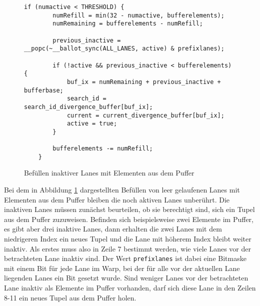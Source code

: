 \begin{figure}[]
	\begin{lstlisting}[language=MyC++]
	if (numactive < THRESHOLD) {
		numRefill = min(32 - numactive, bufferelements);
		numRemaining = bufferelements - numRefill;
		
		previous_inactive = __popc(~__ballot_sync(ALL_LANES, active) & prefixlanes);
		
		if (!active && previous_inactive < bufferelements) {
			buf_ix = numRemaining + previous_inactive + bufferbase;
			search_id = search_id_divergence_buffer[buf_ix];
			current = current_divergence_buffer[buf_ix];
			active = true;
		}
		
		bufferelements -= numRefill;
	}
	\end{lstlisting}
	\caption{Befüllen inaktiver Lanes mit Elementen aus dem Puffer}
	\label{refill_code}
\end{figure}

Bei dem in Abbildung \ref{refill_code} dargestellten Befüllen von leer gelaufenen Lanes mit Elementen aus dem Puffer bleiben die noch aktiven Lanes unberührt.
Die inaktiven Lanes müssen zunächst beurteilen, ob sie berechtigt sind, sich ein Tupel aus dem Puffer zuzuweisen.
Befinden sich beispielsweise zwei Elemente im Puffer, es gibt aber drei inaktive Lanes, dann erhalten die zwei Lanes mit dem niedrigeren Index ein neues Tupel und die Lane mit höherem Index bleibt weiter inaktiv.
Als erstes muss also in Zeile 7 bestimmt werden, wie viele Lanes vor der betrachteten Lane inaktiv sind.
Der Wert \texttt{prefixlanes} ist dabei eine Bitmaske mit einem Bit für jede Lane im Warp, bei der für alle vor der aktuellen Lane liegenden Lanes ein Bit gesetzt wurde.
Sind weniger Lanes vor der betrachteten Lane inaktiv als Elemente im Puffer vorhanden, darf sich diese Lane in den Zeilen 8-11 ein neues Tupel aus dem Puffer holen.

